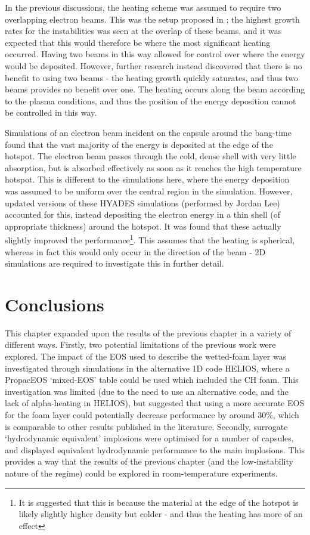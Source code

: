In the previous discussions, the heating scheme was assumed to require two overlapping electron beams. This was the setup proposed in \cite{Ratan2017}; the highest growth rates for the instabilities was seen at the overlap of these beams, and it was expected that this would therefore be where the most significant heating occurred. Having two beams in this way allowed for control over where the energy would be deposited. However, further research instead discovered that there is no benefit to using two beams - the heating growth quickly saturates, and thus two beams provides no benefit over one. The heating occurs along the beam according to the plasma conditions, and thus the position of the energy deposition cannot be controlled in this way.

Simulations of an electron beam incident on the capsule around the bang-time found that the vast majority of the energy is deposited at the edge of the hotspot. The electron beam passes through the cold, dense shell with very little absorption, but is absorbed effectively as soon as it reaches the high temperature hotspot. This is different to the simulations here, where the energy deposition was assumed to be uniform over the central region in the simulation. However, updated versions of these HYADES simulations (performed by Jordan Lee) accounted for this, instead depositing the electron energy in a thin shell (of appropriate thickness) around the hotspot. It was found that these actually slightly improved the performance\footnote{It is suggested that this is because the material at the edge of the hotspot is likely slightly higher density but colder - and thus the heating has more of an effect}. This assumes that the heating is spherical, whereas in fact this would only occur in the direction of the beam - 2D simulations are required to investigate this in further detail.

\section{Conclusions}
This chapter expanded upon the results of the previous chapter in a variety of different ways. Firstly, two potential limitations of the previous work were explored. The impact of the EOS used to describe the wetted-foam layer was investigated through simulations in the alternative 1D code HELIOS, where a PropacEOS `mixed-EOS' table could be used which included the CH foam. This investigation was limited (due to the need to use an alternative code, and the lack of alpha-heating in HELIOS), but suggested that using a more accurate EOS for the foam layer could potentially decrease performance by around 30\%, which is comparable to other results published in the literature. Secondly, surrogate `hydrodynamic equivalent' implosions were optimised for a number of capsules, and displayed equivalent hydrodynamic performance to the main implosions. This provides a way that the results of the previous chapter (and the low-instability nature of the regime) could be explored in room-temperature experiments.

